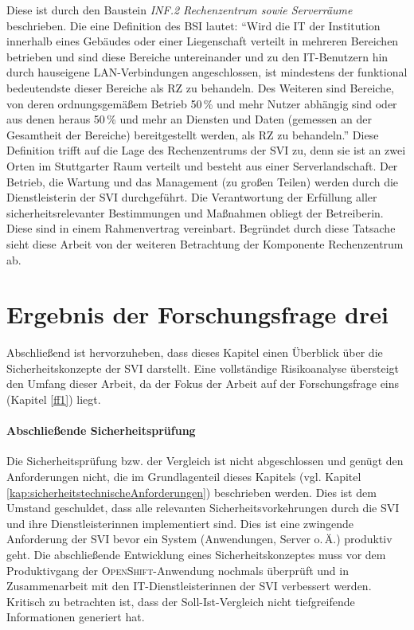 Diese ist durch den Baustein \textit{INF.2 Rechenzentrum sowie Serverräume} beschrieben. Die eine Definition des \ac{BSI} lautet: \enquote{Wird die IT der Institution innerhalb eines Gebäudes oder einer Liegenschaft verteilt in mehreren Bereichen betrieben und sind diese Bereiche untereinander und zu den IT-Benutzern hin durch hauseigene LAN-Verbindungen angeschlossen, ist mindestens der funktional bedeutendste dieser Bereiche als RZ zu behandeln. Des Weiteren sind Bereiche, von deren ordnungsgemäßem Betrieb 50\,\% und mehr Nutzer abhängig sind oder aus denen heraus 50\,\% und mehr an Diensten und Daten (gemessen an der Gesamtheit der Bereiche) bereitgestellt werden, als RZ zu behandeln.}\autocite[][S.\,755]{bundesamt_fur_sicherheit_in_der_informationstechnik_bsi_it-grundschutz-kompendium_2020} Diese Definition trifft auf die Lage des Rechenzentrums der \ac{SVI} zu, denn sie ist an zwei Orten im Stuttgarter Raum verteilt und besteht aus einer Serverlandschaft. Der Betrieb, die Wartung und das Management (zu großen Teilen) werden durch die Dienstleisterin der \ac{SVI} durchgeführt. Die Verantwortung der Erfüllung aller sicherheitsrelevanter Bestimmungen und Maßnahmen obliegt der Betreiberin. Diese sind in einem Rahmenvertrag vereinbart. Begründet durch diese Tatsache sieht diese Arbeit von der weiteren Betrachtung der Komponente Rechenzentrum ab.

\section{Ergebnis der Forschungsfrage drei}
Abschließend ist hervorzuheben, dass dieses Kapitel einen Überblick über die Sicherheitskonzepte der \ac{SVI} darstellt. Eine vollständige Risikoanalyse übersteigt den Umfang dieser Arbeit, da der Fokus der Arbeit auf der Forschungsfrage eins (Kapitel \vref{ff1}) liegt. 

\paragraph{Abschließende Sicherheitsprüfung} Die Sicherheitsprüfung bzw. der Vergleich ist nicht abgeschlossen und genügt den Anforderungen nicht, die im Grundlagenteil dieses Kapitels (vgl. Kapitel \vref{kap:sicherheitstechnischeAnforderungen}) beschrieben werden. Dies ist dem Umstand geschuldet, dass alle relevanten Sicherheitsvorkehrungen durch die \ac{SVI} und ihre Dienstleisterinnen implementiert sind. Dies ist eine zwingende Anforderung der \ac{SVI} bevor ein System (Anwendungen, Server o.\,Ä.) produktiv geht. Die abschließende Entwicklung eines Sicherheitskonzeptes muss vor dem Produktivgang der \textsc{OpenShift}-Anwendung nochmals überprüft und in Zusammenarbeit mit den IT-Dienstleisterinnen der \ac{SVI} verbessert werden. Kritisch zu betrachten ist, dass der Soll-Ist-Vergleich nicht tiefgreifende Informationen generiert hat. 

